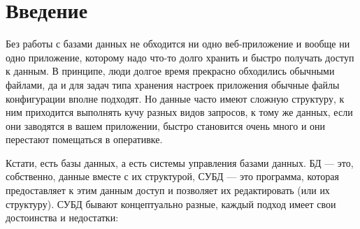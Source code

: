 \documentclass{../../text-style}
\begin{document}
\maketitle
\thispagestyle{empty}

\section{Введение}

Без работы с базами данных не обходится ни одно веб-приложение и вообще ни одно приложение, которому надо что-то долго хранить и быстро получать доступ к данным. В принципе, люди долгое время прекрасно обходились обычными файлами, да и для задач типа хранения настроек приложения обычные файлы конфигурации вполне подходят. Но данные часто имеют сложную структуру, к ним приходится выполнять кучу разных видов запросов, к тому же данных, если они заводятся в вашем приложении, быстро становится очень много и они перестают помещаться в оперативке.

Кстати, есть базы данных, а есть системы управления базами данных. БД --- это, собственно, данные вместе с их структурой, СУБД --- это программа, которая предоставляет к этим данным доступ и позволяет их редактировать (или их структуру). СУБД бывают концептуально разные, каждый подход имеет свои достоинства и недостатки:
\end{document}
